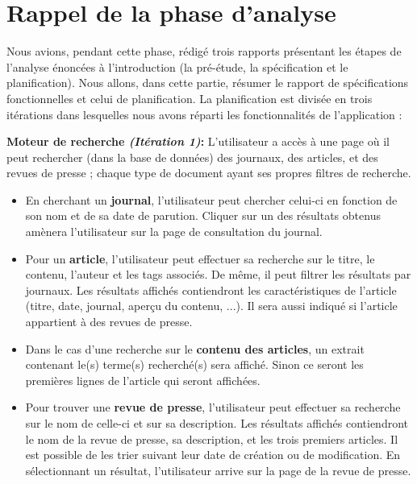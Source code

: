 \section{Rappel de la phase d'analyse}
\label{sec:rappel}

	Nous avions, pendant cette phase, rédigé trois rapports présentant les étapes de l'analyse énoncées à l'introduction (la pré-étude\cite{Pretude}, la spécification\cite{Specs} et le planification\cite{Planif}). Nous allons, dans cette partie, résumer le rapport de spécifications fonctionnelles et celui de planification. La planification est divisée en trois itérations dans lesquelles nous avons réparti les fonctionnalités de l'application : 

	\textbf{Moteur de recherche \textit{(Itération 1)}:} L'utilisateur a accès à une page où il peut rechercher (dans la base de données) des journaux, des articles, et des revues de presse ; chaque type de document ayant ses propres filtres de recherche.
	
	\begin{itemize}
	\item En cherchant un \textbf{journal}, l'utilisateur peut chercher celui-ci en fonction de son nom et de sa date de parution. Cliquer sur un des résultats obtenus amènera l'utilisateur sur la page de consultation du journal. 
	\item Pour un \textbf{article}, l'utilisateur peut effectuer sa recherche sur le titre, le contenu, l'auteur et les tags associés. De même, il peut filtrer les résultats par journaux. Les résultats affichés contiendront les caractéristiques de l'article (titre, date, journal, aperçu du contenu, ...). Il sera aussi indiqué si l'article appartient à des revues de presse. 
	\item Dans le cas d'une recherche sur le \textbf{contenu des articles}, un extrait contenant le(s) terme(s) recherché(s) sera affiché. Sinon ce seront les premières lignes de l'article qui seront affichées. 
	\item Pour trouver une \textbf{revue de presse}, l'utilisateur peut effectuer sa recherche sur le nom de celle-ci et sur sa description. Les résultats affichés contiendront le nom de la revue de presse, sa description, et les trois premiers articles. Il est possible de les trier suivant leur date de création ou de modification. En sélectionnant un résultat, l'utilisateur arrive sur la page de la revue de presse. 
\end{itemize}

